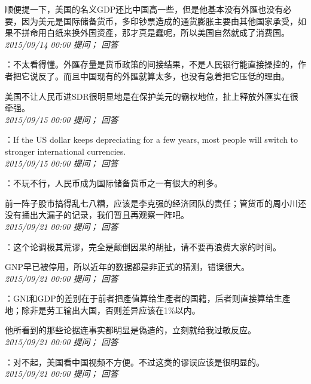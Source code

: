 \documentclass[twocolumn]{ctexart}
\begin{document}
顺便提一下，美国的名义GDP还比中国高一些，但是他基本没有外匯也没有必要，因为美元是国际储备货币，多印钞票造成的通货膨胀主要由其他国家承受，如果不拼命用白纸来换外国资產，那才真是蠢呢，所以美国自然就成了消费国。\\

\textit{\hfill\noindent\small 2015/09/14 00:00 提问； 回答}

：不太看得懂。外匯存量是货币政策的间接结果，不是人民银行能直接操控的，作者把它说反了。而且中国现有的外匯就算太多，也没有急着把它压低的理由。

美国不让人民币进SDR很明显地是在保护美元的霸权地位，扯上释放外匯实在很牵强。\\

\textit{\hfill\noindent\small 2015/09/15 00:00 提问； 回答}

：If the US dollar keeps depreciating for a few years, most people will switch to stronger international currencies.\\

\textit{\hfill\noindent\small 2015/09/15 00:00 提问； 回答}

：不玩不行，人民币成为国际储备货币之一有很大的利多。

前一阵子股市搞得乱七八糟，应该是李克强的经济团队的责任；管货币的周小川还没有捅出大漏子的记录，我们暂且再观察一阵吧。\\

\textit{\hfill\noindent\small 2015/09/21 00:00 提问； 回答}

：这个论调极其荒谬，完全是颠倒因果的胡扯，请不要再浪费大家的时间。

GNP早已被停用，所以近年的数据都是非正式的猜测，错误很大。\\

\textit{\hfill\noindent\small 2015/09/21 00:00 提问； 回答}

：GNI和GDP的差别在于前者把產值算给生產者的国籍，后者则直接算给生產地；除非是劳工输出大国，否则差异应该在1\%以内。

他所看到的那些论据连事实都明显是偽造的，立刻就给我过敏反应。\\

\textit{\hfill\noindent\small 2015/09/21 00:00 提问； 回答}

：对不起，美国看中国视频不方便。不过这类的谬误应该是很明显的。\\

\textit{\hfill\noindent\small 2015/09/21 00:00 提问； 回答}
\end{document}
